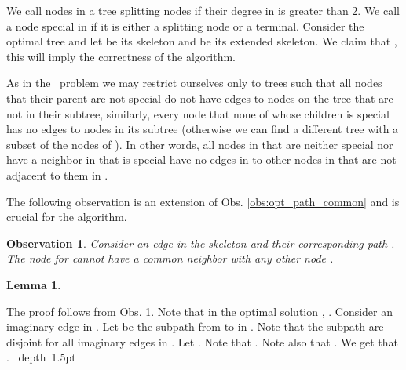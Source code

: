\documentclass[12pt]{article}
\newtheorem{lemma}[theorem]{Lemma}
\newtheorem{observation}[theorem]{Observation}
\def\Proof{\par\noindent{\bf Proof:~}}
\def\blackslug{\hbox{\hskip 1pt \vrule width 4pt height 8pt
    depth 1.5pt \hskip 1pt}}
\def\QED{\quad\blackslug\lower 8.5pt\null\par}
\newcommand{\PP}[0]{ }
\begin{document}
We call nodes in a tree  splitting nodes if their degree in  is greater than 2.
We call a node special in  if it is either a splitting node or a terminal.
Consider the optimal tree  and let  be its skeleton and  be its extended skeleton.
We claim that , this will imply the correctness of the algorithm.

As in the \PP\ problem we may restrict ourselves only to trees such that all nodes that their parent are not special do not have edges to nodes on the tree that are not in their subtree, similarly, every node that none of whose children is special has no edges to nodes in its subtree (otherwise we can find a different tree with a subset of the nodes of ). In other words, all nodes in  that are neither special nor have a neighbor in  that is special have no edges in  to other nodes in  that are not adjacent to them in .

The following observation is an extension of Obs. \ref {obs:opt_path_common} and is crucial for the algorithm.
\begin{observation}
\label{obs:tree-neighbors}
Consider an edge  in the skeleton  and their corresponding path .
The node  for  cannot have a common neighbor with any other node .
\end{observation}





\begin{lemma}

\end{lemma}
\Proof
The proof follows from Obs. \ref{obs:tree-neighbors}.
Note that in the optimal solution , .
Consider an imaginary edge  in . Let  be the subpath from  to  in .
Note that the subpath  are disjoint for all imaginary edges  in  .
Let .
Note that .
Note also that .
We get that .
\QED
\end{document}
